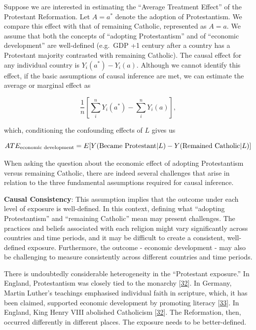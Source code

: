 \documentclass[
  singlecolumn]{article}
\begin{document}
Suppose we are interested in estimating the ``Average Treatment Effect''
of the Protestant Reformation. Let \(A = a^*\) denote the adoption of
Protestantism. We compare this effect with that of remaining Catholic,
represented as \(A = a\). We assume that both the concepts of ``adopting
Protestantism'' and of ``economic development'' are well-defined
(e.g.~GDP +1 century after a country has a Protestant majority
contrasted with remaining Catholic). The causal effect for any
individual country is \(Y_i(a^*) - Y_i(a)\). Although we cannot identify
this effect, if the basic assumptions of causal inference are met, we
can estimate the average or marginal effect as

\[\frac{1}{n} \left[\sum_i^{n} Y_i(a^*) - \sum_i^{n} Y_i(a)\right],\]

which, conditioning the confounding effects of \(L\) gives us

\[ATE_{\textnormal{economic~development}} = E[Y(\textnormal{Became~Protestant}|L) - Y(\textnormal{Remained~Catholic}|L)]\]

When asking the question about the economic effect of adopting
Protestantism versus remaining Catholic, there are indeed several
challenges that arise in relation to the three fundamental assumptions
required for causal inference.

\textbf{Causal Consistency}: This assumption implies that the outcome
under each level of exposure is well-defined. In this context, defining
what ``adopting Protestantism'' and ``remaining Catholic'' mean may
present challenges. The practices and beliefs associated with each
religion might vary significantly across countries and time periods, and
it may be difficult to create a consistent, well-defined exposure.
Furthermore, the outcome - economic development - may also be
challenging to measure consistently across different countries and time
periods.

There is undoubtedly considerable heterogeneity in the ``Protestant
exposure.'' In England, Protestantism was closely tied to the monarchy
{[}\protect\hyperlink{ref-collinson2007}{32}{]}. In Germany, Martin
Luther's teachings emphasised individual faith in scripture, which, it
has been claimed, supported economic development by promoting literacy
{[}\protect\hyperlink{ref-gawthrop1984}{33}{]}. In England, King Henry
VIII abolished Catholicism
{[}\protect\hyperlink{ref-collinson2007}{32}{]}. The Reformation, then,
occurred differently in different places. The exposure needs to be
better-defined.
\end{document}
